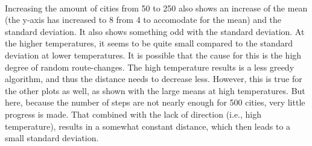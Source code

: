 \documentclass[10pt,a4paper]{article}
\begin{document}
 \\
Increasing the amount of cities from 50 to 250 also shows an increase of the mean (the y-axis has increased to 8 from 4 to accomodate for the mean) and the standard deviation. It also shows something odd with the standard deviation. At the higher temperatures, it seems to be quite small compared to the standard deviation at lower temperatures. It is possible that the cause for this is the high degree of random route-changes. The high temperature results is a less greedy algorithm, and thus the distance needs to decrease less. However, this is true for the other plots as well, as shown with the large means at high temperatures. But here, because the number of steps are not nearly enough for 500 cities, very little progress is made. That combined with the lack of direction (i.e., high temperature), results in a somewhat constant distance, which then leads to a small standard deviation.\\

 \\
\end{document}
